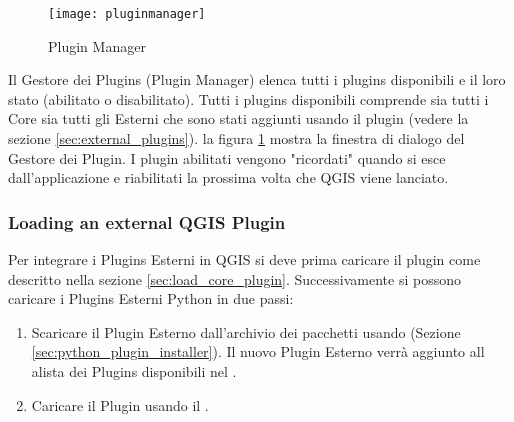 \begin{figure}[ht]
   \begin{center}
   \caption{Plugin Manager \nixcaption}\label{fig:pluginmanager}\smallskip
   \texttt{[image: pluginmanager]}
\end{center}
\end{figure}

Il Gestore dei Plugins (Plugin Manager) elenca tutti i plugins disponibili e il loro stato (abilitato o disabilitato).
Tutti i plugins disponibili comprende sia tutti i Core sia tutti gli Esterni che sono stati aggiunti usando il plugin  (vedere la sezione \ref{sec:external_plugins}). 
la figura \ref{fig:pluginmanager} mostra la finestra di dialogo del Gestore dei Plugin.
I plugin abilitati vengono "ricordati" quando si esce dall'applicazione e riabilitati la prossima volta che QGIS viene lanciato.

\begin{Tip}\caption{\textsc{Il Crash dei Plugins}}
\end{Tip} 

\subsubsection{Loading an external QGIS Plugin}\label{sec:load_external_plugin} 

Per integrare i Plugins Esterni in QGIS si deve prima caricare il plugin  come descritto nella sezione \ref{sec:load_core_plugin}.
Successivamente si possono caricare i Plugins Esterni Python in due passi: 

\begin{enumerate}
\item Scaricare il Plugin Esterno dall'archivio dei pacchetti usando   (Sezione \ref{sec:python_plugin_installer}).
Il nuovo Plugin Esterno verrà aggiunto all alista dei Plugins disponibili nel .
\item Caricare il Plugin usando il .
\end{enumerate}

